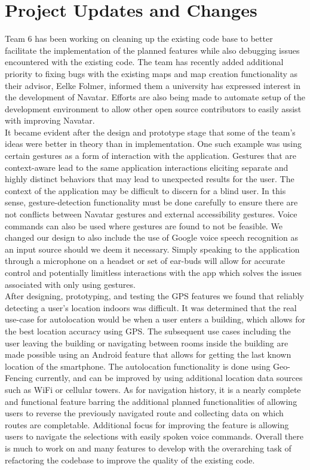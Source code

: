 \documentclass{scrreprt}
\begin{document}
\chapter{Project Updates and Changes}
Team 6 has been working on cleaning up the existing code base to better facilitate the implementation of the planned features while also debugging issues encountered with the existing code. The team has recently added additional priority to fixing bugs with the existing maps and map creation functionality as their advisor, Eelke Folmer, informed them a university has expressed interest in the development of Navatar. Efforts are also being made to automate setup of the development environment to allow other open source contributors to easily assist with improving Navatar.\\
It became evident after the design and prototype stage that some of the team's ideas were better in theory than in implementation. One such example was using certain gestures as a form of interaction with the application. Gestures that are context-aware lead to the same application interactions eliciting separate and highly distinct behaviors that may lead to unexpected results for the user. The context of the application may be difficult to discern for a blind user. In this sense, gesture-detection functionality must be done carefully to ensure there are not conflicts between Navatar gestures and external accessibility gestures. Voice commands can also be used where gestures are found to not be feasible. We changed our design to also include the use of Google voice speech recognition as an input source should we deem it necessary. Simply speaking to the application through a microphone on a headset or set of ear-buds will allow for accurate control and potentially limitless interactions with the app which solves the issues associated with only using gestures.\\
After designing, prototyping, and testing the GPS features we found that reliably detecting a user’s location indoors was difficult. It was determined that the real use-case for autolocation would be when a user enters a building, which allows for the best location accuracy using GPS. The subsequent use cases including the user leaving the building or navigating between rooms inside the building are made possible using an Android feature that allows for getting the last known location of the smartphone. The autolocation functionality is done using Geo-Fencing currently, and can be improved by using additional location data sources such as WiFi or cellular towers. As for navigation history, it is a nearly complete and functional feature barring the additional planned functionalities of allowing users to reverse the previously navigated route and collecting data on which routes are completable. Additional focus for improving the feature is allowing users to navigate the selections with easily spoken voice commands. Overall there is much to work on and many features to develop with the overarching task of refactoring the codebase to improve the quality of the existing code.
\end{document}
